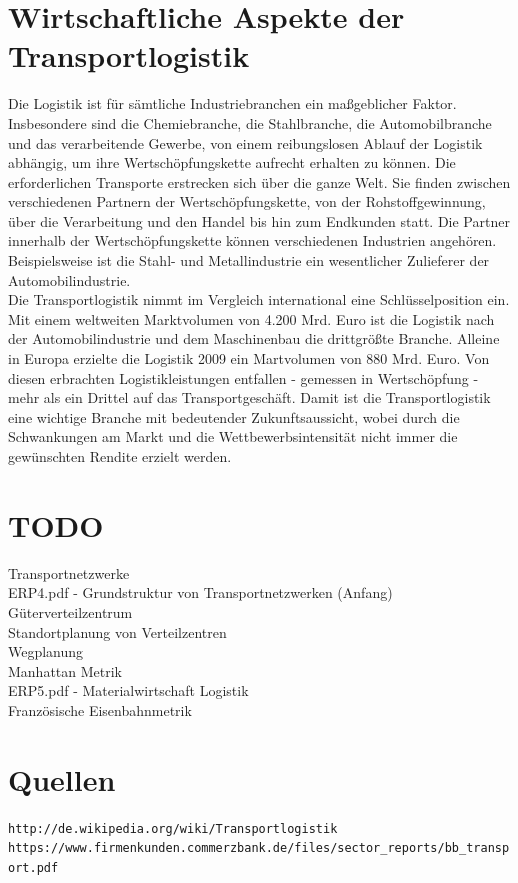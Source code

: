 \documentclass[a4paper,12pt]{scrreprt}
\begin{document}
	\chapter{Wirtschaftliche Aspekte der Transportlogistik}
	
	Die Logistik ist für sämtliche Industriebranchen ein maßgeblicher Faktor. Insbesondere sind die Chemiebranche, die Stahlbranche, die Automobilbranche und das verarbeitende Gewerbe, von einem reibungslosen Ablauf der Logistik abhängig, um ihre Wertschöpfungskette aufrecht erhalten zu können. Die erforderlichen Transporte erstrecken sich über die ganze Welt. Sie finden zwischen verschiedenen Partnern der Wertschöpfungskette, von der Rohstoffgewinnung, über die Verarbeitung und den Handel bis hin zum Endkunden statt. Die Partner innerhalb der Wertschöpfungskette können verschiedenen Industrien angehören. Beispielsweise ist die Stahl- und Metallindustrie ein wesentlicher Zulieferer der Automobilindustrie.\\
	
	Die Transportlogistik nimmt im Vergleich international eine Schlüsselposition ein. Mit einem weltweiten Marktvolumen von 4.200 Mrd. Euro ist die Logistik nach der Automobilindustrie und dem Maschinenbau die drittgrößte Branche. Alleine in Europa erzielte die Logistik 2009 ein Martvolumen von 880 Mrd. Euro. Von diesen erbrachten Logistikleistungen entfallen - gemessen in Wertschöpfung - mehr als ein Drittel auf das Transportgeschäft. Damit ist die Transportlogistik eine wichtige Branche mit bedeutender Zukunftsaussicht, wobei durch die Schwankungen am Markt und die Wettbewerbsintensität nicht immer die gewünschten Rendite erzielt werden.\\
	
	
	\chapter{TODO}
	Transportnetzwerke\\
	ERP4.pdf - Grundstruktur von Transportnetzwerken (Anfang)\\
	Güterverteilzentrum\\
	Standortplanung von Verteilzentren\\
	Wegplanung\\
	Manhattan Metrik\\
	ERP5.pdf - Materialwirtschaft Logistik\\
	Französische Eisenbahnmetrik\\

	
\chapter{Quellen} 
\nolinkurl{http://de.wikipedia.org/wiki/Transportlogistik}
\nolinkurl{https://www.firmenkunden.commerzbank.de/files/sector_reports/bb_transport.pdf}
\end{document}
